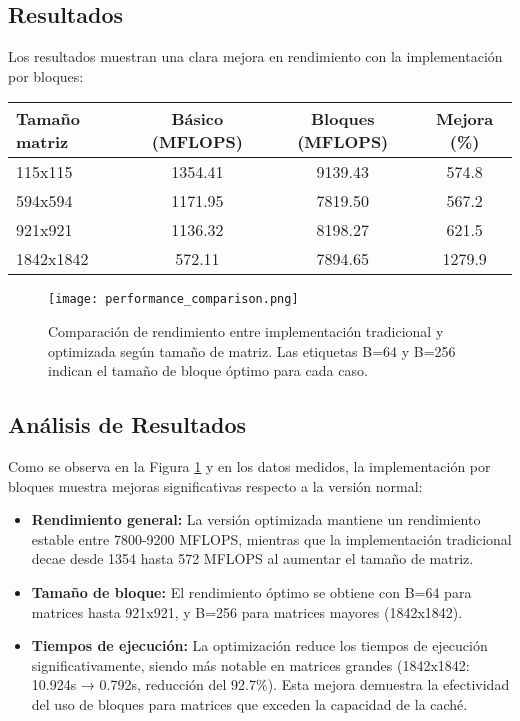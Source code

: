 \documentclass{article}
\begin{document}
\subsection{Resultados}
Los resultados muestran una clara mejora en rendimiento con la implementación por bloques:

\begin{table}[!h]
\centering
\begin{tabular}{@{}lccc@{}}
\toprule
\textbf{Tamaño matriz} & \textbf{Básico (MFLOPS)} & \textbf{Bloques (MFLOPS)} & \textbf{Mejora (\%)} \\
\midrule
115x115 & 1354.41 & 9139.43 & 574.8 \\
594x594 & 1171.95 & 7819.50 & 567.2 \\
921x921 & 1136.32 & 8198.27 & 621.5 \\
1842x1842 & 572.11 & 7894.65 & 1279.9 \\
\bottomrule
\end{tabular}
\end{table}

\begin{figure}[!h]
\centering
\texttt{[image: performance\_comparison.png]}
\caption{Comparación de rendimiento entre implementación tradicional y optimizada según tamaño de matriz. Las etiquetas B=64 y B=256 indican el tamaño de bloque óptimo para cada caso.}
\label{fig:performance_comparison}
\end{figure}

\subsection{Análisis de Resultados}
Como se observa en la Figura \ref{fig:performance_comparison} y en los datos medidos, la implementación por bloques muestra mejoras significativas respecto a la versión normal:

\begin{itemize}[noitemsep]
    \item \textbf{Rendimiento general:} La versión optimizada mantiene un rendimiento estable entre 7800-9200 MFLOPS, mientras que la implementación tradicional decae desde 1354 hasta 572 MFLOPS al aumentar el tamaño de matriz.
    
    \item \textbf{Tamaño de bloque:} El rendimiento óptimo se obtiene con B=64 para matrices hasta 921x921, y B=256 para matrices mayores (1842x1842).
    
    \item \textbf{Tiempos de ejecución:} La optimización reduce los tiempos de ejecución significativamente, siendo más notable en matrices grandes (1842x1842: 10.924s → 0.792s, reducción del 92.7\%). Esta mejora demuestra la efectividad del uso de bloques para matrices que exceden la capacidad de la caché.
\end{itemize}
\end{document}
